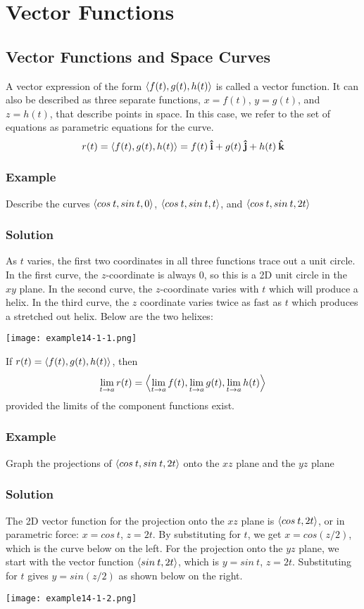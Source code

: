 \chapter{Vector Functions}

\section{Vector Functions and Space Curves}
A vector expression of the form $\ev{f(t),g(t),h(t)}$ is called a vector function.
It can also be described as three separate functions, $x=f(t)$, $y=g(t)$, and $z=h(t)$,
that describe points in space. In this case, we refer to the set of equations as
parametric equations for the curve.
$$r(t)=\ev{f(t),g(t),h(t)}=f(t)\ihat+g(t)\jhat+h(t)\khat$$

\subsection*{Example}
Describe the curves $\ev{cos\:t,sin\:t,0}$, $\ev{cos\:t,sin\:t,t}$, and
$\ev{cos\:t,sin\:t,2t}$

\subsection*{Solution}
As $t$ varies, the first two coordinates in all three functions trace out a unit circle.
In the first curve, the $z$-coordinate is always 0, so this is a 2D unit circle in the
$xy$ plane. In the second curve, the $z$-coordinate varies with $t$ which will
produce a helix. In the third curve, the $z$ coordinate varies twice as fast as $t$
which produces a stretched out helix. Below are the two helixes:
\begin{center}
    \texttt{[image: example14-1-1.png]}
\end{center}

If $r(t)=\ev{f(t),g(t),h(t)}$, then
$$\lim_{t\to a}r(t)=\ev{\lim_{t\to a}f(t),\lim_{t\to a}g(t),\lim_{t\to a}h(t)}$$
provided the limits of the component functions exist.

\subsection*{Example}
Graph the projections of $\ev{cos\:t,sin\:t,2t}$ onto the $xz$ plane and the $yz$ plane

\subsection*{Solution}
The 2D vector function for the projection onto the $xz$ plane is $\ev{cos\:t,2t}$,
or in parametric force: $x=cos\:t$, $z=2t$. By substituting for $t$, we get
$x=cos(z/2)$, which is the curve below on the left. For the projection onto the $yz$
plane, we start with the vector function $\ev{sin\:t,2t}$, which is $y=sin\:t$,
$z=2t$. Substituting for $t$ gives $y=sin(z/2)$ as shown below on the right.
\begin{center}
    \texttt{[image: example14-1-2.png]}
\end{center}


